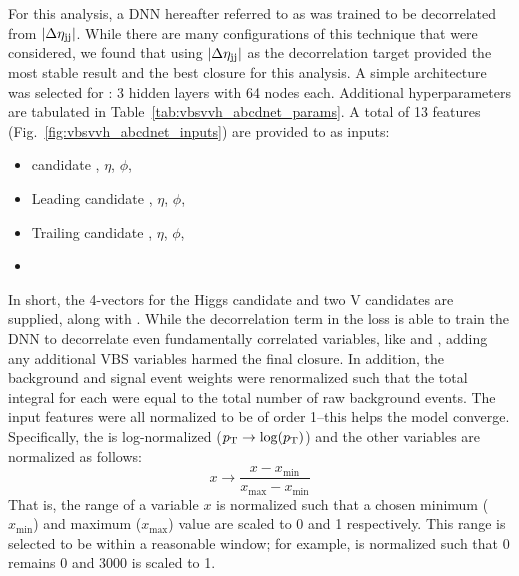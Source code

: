 For this analysis, a DNN hereafter referred to as \ABCDNet was trained to be decorrelated from $|\Delta\eta_{\mathrm{j}\mathrm{j}}|$.
While there are many configurations of this technique that were considered, we found that using $|\Delta\eta_{\mathrm{j}\mathrm{j}}|$ as the decorrelation target provided the most stable result and the best closure for this analysis. 
A simple architecture was selected for \ABCDNet: 3 hidden layers with 64 nodes each. %
Additional hyperparameters are tabulated in Table~\ref{tab:vbsvvh_abcdnet_params}. 
A total of 13 features (Fig.~\ref{fig:vbsvvh_abcdnet_inputs}) are provided to \ABCDNet as inputs:
\begin{itemize}
    \item \Htobb candidate \pt, $\eta$, $\phi$, \MPNet
    \item Leading \Vtoqq candidate \pt, $\eta$, $\phi$, \MPNet
    \item Trailing \Vtoqq candidate \pt, $\eta$, $\phi$, \MPNet
    \item \Mjj
\end{itemize}
In short, the 4-vectors for the Higgs candidate and two V candidates are supplied, along with \Mjj. 
While the decorrelation term in the loss is able to train the DNN to decorrelate even fundamentally correlated variables, like \Mjj and \detajj, adding any additional VBS variables harmed the final closure. 
In addition, the background and signal event weights were renormalized such that the total integral for each were equal to the total number of raw background events.
The input features were all normalized to be of order 1--this helps the model converge. 
Specifically, the \pt is log-normalized ($p_{\mathrm{T}} \rightarrow \log(p_{\mathrm{T}})$) and the other variables are normalized as follows:
\begin{equation}
    x \rightarrow \frac{x - x_\text{min}}{x_\text{max} - x_\text{min}}
\end{equation}
That is, the range of a variable $x$ is normalized such that a chosen minimum ($x_\text{min}$) and maximum ($x_\text{max}$) value are scaled to 0 and 1 respectively. 
This range is selected to be within a reasonable window; for example, \Mjj is normalized such that 0 remains 0 and 3000 is scaled to 1.

